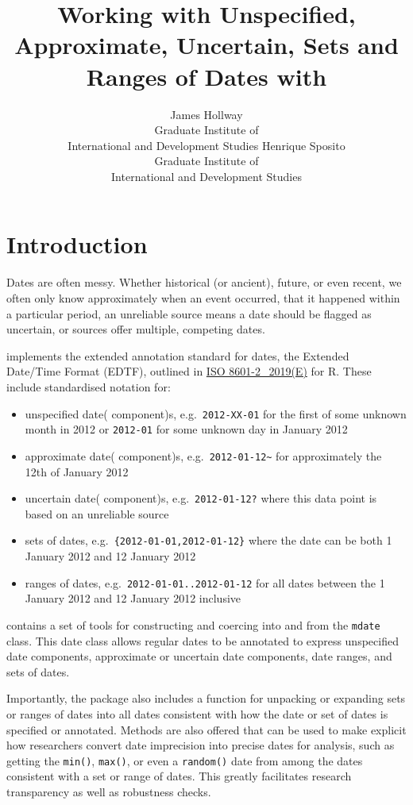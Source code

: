 \documentclass[
]{jss}
\author{
James Hollway\\Graduate Institute of\\
International and Development Studies \And Henrique Sposito\\Graduate
Institute of\\
International and Development Studies
}
\title{Working with Unspecified, Approximate, Uncertain, Sets and Ranges
of Dates with \pkg{messydates}}
\providecommand{\tightlist}{%
  \setlength{\itemsep}{0pt}\setlength{\parskip}{0pt}}
\begin{document}
\hypertarget{introduction}{%
\section{Introduction}\label{introduction}}

Dates are often messy. Whether historical (or ancient), future, or even
recent, we often only know approximately when an event occurred, that it
happened within a particular period, an unreliable source means a date
should be flagged as uncertain, or sources offer multiple, competing
dates.

 implements the extended annotation standard for dates,
the Extended Date/Time Format (EDTF), outlined in
\href{https://www.iso.org/standard/70908.html}{ISO 8601-2\_2019(E)} for
R. These include standardised notation for:

\begin{itemize}
\tightlist
\item
  unspecified date( component)s, e.g.~\texttt{2012-XX-01} for the first
  of some unknown month in 2012 or \texttt{2012-01} for some unknown day
  in January 2012
\item
  approximate date( component)s,
  e.g.~\texttt{2012-01-12\textasciitilde{}} for approximately the 12th
  of January 2012
\item
  uncertain date( component)s, e.g.~\texttt{2012-01-12?} where this data
  point is based on an unreliable source
\item
  sets of dates, e.g.~\texttt{\{2012-01-01,2012-01-12\}} where the date
  can be both 1 January 2012 and 12 January 2012
\item
  ranges of dates, e.g.~\texttt{2012-01-01..2012-01-12} for all dates
  between the 1 January 2012 and 12 January 2012 inclusive
\end{itemize}

 contains a set of tools for constructing and coercing
into and from the \texttt{mdate} class. This date class allows regular
dates to be annotated to express unspecified date components,
approximate or uncertain date components, date ranges, and sets of
dates.

Importantly, the package also includes a function for unpacking or
expanding sets or ranges of dates into all dates consistent with how the
date or set of dates is specified or annotated. Methods are also offered
that can be used to make explicit how researchers convert date
imprecision into precise dates for analysis, such as getting the
\texttt{min()}, \texttt{max()}, or even a \texttt{random()} date from
among the dates consistent with a set or range of dates. This greatly
facilitates research transparency as well as robustness checks.
\end{document}
